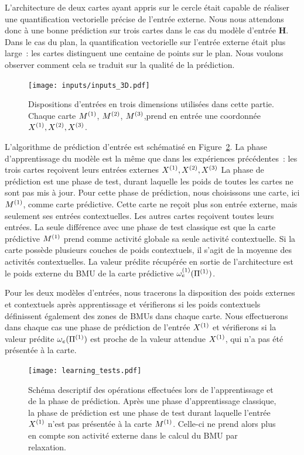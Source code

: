 \documentclass[../main]{subfiles}
\begin{document}
L'architecture de deux cartes ayant appris sur le cercle était capable de réaliser une quantification vectorielle précise de l'entrée externe. Nous nous attendons donc à une bonne prédiction sur trois cartes dans le cas du modèle d'entrée \textbf{H}. Dans le cas du plan, la quantification vectorielle sur l'entrée externe était plus large~: les cartes distinguent une centaine de points sur le plan. Nous voulons observer comment cela se traduit sur la qualité de la prédiction.

\begin{figure}[h!]
	\texttt{[image: inputs/inputs\_3D.pdf]}
	\caption{Dispositions d'entrées en trois dimensions utilisées dans cette partie. Chaque carte $M^{({1})}$, $M^{({2})}$, $M^{({3})}$,prend en entrée une coordonnée $X^{({1})}, X^{({2})}, X^{({3})}$. \label{fig:inputs_3D}}
\end{figure}

L'algorithme de prédiction d'entrée est schématisé en Figure~\ref{fig:schema_pred}.
La phase d'apprentissage du modèle est la même que dans les expériences précédentes~: les trois cartes reçoivent leurs entrées externes $X^{({1})},X^{({2})}, X^{({3})} $
La phase de prédiction est une phase de test, durant laquelle les poids de toutes les cartes ne sont pas mis à jour.
Pour cette phase de prédiction, nous choisissons une carte, ici $M^{({1})}$, comme carte prédictive. 
Cette carte ne reçoit plus son entrée externe, mais seulement ses entrées contextuelles. 
Les autres cartes reçoivent toutes leurs entrées.
La seule différence avec une phase de test classique est que la carte prédictive $M^{({1})}$ prend comme activité globale sa seule activité contextuelle. Si la carte possède plusieurs couches de poids contextuels, il s'agit de la moyenne des activités contextuelles.
La valeur prédite récupérée en sortie de l'architecture est le poids externe du BMU de la carte prédictive $\omega_{e}^{({1})}(\Pi^{({1})})$.

Pour les deux modèles d'entrées, nous tracerons la disposition des poids externes et contextuels après apprentissage et vérifierons si les poids contextuels définissent également des zones de BMUs dans chaque carte.
Nous effectuerons dans chaque cas une phase de prédiction de l'entrée $X^{({1})}$ et vérifierons si la valeur prédite $\omega_e(\Pi^{({1})})$ est proche de la valeur attendue $X^{({1})}$, qui n'a pas été présentée à la carte.

\begin{figure}
	\texttt{[image: learning\_tests.pdf]}
	\caption{Schéma descriptif des opérations effectuées lors de l'apprentissage et de la phase de prédiction. Après une phase d'apprentissage classique, la phase de prédiction est une phase de test durant laquelle l'entrée $X^{({1})}$ n'est pas présentée à la carte $M^{({1})}$. Celle-ci ne prend alors plus en compte son activité externe dans le calcul du BMU par relaxation. \label{fig:schema_pred}}
\end{figure}
\end{document}
